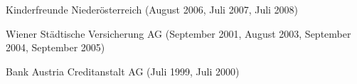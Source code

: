 \nopagebreak
{}
	{\begin{cvenumerate}
		\item Kinderfreunde	Niederösterreich (August 2006, Juli 2007, Juli 2008)
		\item Wiener Städtische Versicherung AG (September 2001, August 2003,
		September 2004, September 2005)
		\item Bank Austria Creditanstalt AG (Juli 1999, Juli 2000)
	\end{cvenumerate}}